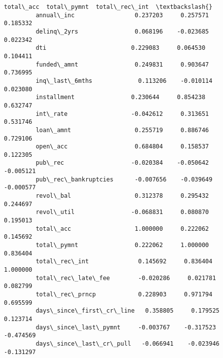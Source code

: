 \documentclass[10pt,notitlepage,onecolumn,aps,pra]{revtex4-1}
\begin{document}
\begin{Verbatim}[commandchars=\\\{\}]
                                   total\_acc  total\_pymnt  total\_rec\_int  \textbackslash{}
         annual\_inc                 0.237203     0.257571       0.185332   
         delinq\_2yrs                0.068196    -0.023685       0.022342   
         dti                        0.229083     0.064530       0.104411   
         funded\_amnt                0.249831     0.903647       0.736995   
         inq\_last\_6mths             0.113206    -0.010114       0.023080   
         installment                0.230644     0.854238       0.632747   
         int\_rate                  -0.042612     0.313651       0.531746   
         loan\_amnt                  0.255719     0.886746       0.729106   
         open\_acc                   0.684804     0.158537       0.122305   
         pub\_rec                   -0.020384    -0.050642      -0.005121   
         pub\_rec\_bankruptcies      -0.007656    -0.039649      -0.000577   
         revol\_bal                  0.312378     0.295432       0.244697   
         revol\_util                -0.068831     0.080870       0.195013   
         total\_acc                  1.000000     0.222062       0.145692   
         total\_pymnt                0.222062     1.000000       0.836404   
         total\_rec\_int              0.145692     0.836404       1.000000   
         total\_rec\_late\_fee        -0.020286     0.021781       0.082799   
         total\_rec\_prncp            0.228903     0.971794       0.695599   
         days\_since\_first\_cr\_line   0.358805     0.179525       0.123714   
         days\_since\_last\_pymnt     -0.003767    -0.317523      -0.474569   
         days\_since\_last\_cr\_pull   -0.066941    -0.023946      -0.131297   
         

\end{Verbatim}
\end{document}
